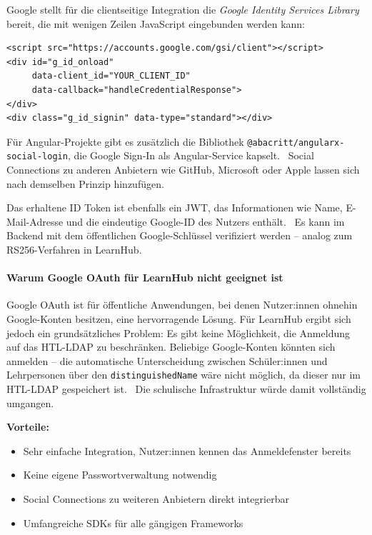 Google stellt für die clientseitige Integration die
\textit{Google Identity Services Library} bereit, die mit wenigen
Zeilen JavaScript eingebunden werden kann:~\cite{google-oauth}

\begin{lstlisting}[style=htmlstyle,
                   caption={Einbindung von Google Sign-In im Frontend},
                   label={lst:google-signin}]
<script src="https://accounts.google.com/gsi/client"></script>
<div id="g_id_onload"
     data-client_id="YOUR_CLIENT_ID"
     data-callback="handleCredentialResponse">
</div>
<div class="g_id_signin" data-type="standard"></div>
\end{lstlisting}

Für Angular-Projekte gibt es zusätzlich die Bibliothek
\texttt{@abacritt/angularx-social-login}, die Google Sign-In als
Angular-Service kapselt.~\cite{google-oauth} Social Connections zu
anderen Anbietern wie GitHub, Microsoft oder Apple lassen sich nach
demselben Prinzip hinzufügen.

Das erhaltene ID Token ist ebenfalls ein JWT, das Informationen wie
Name, E-Mail-Adresse und die eindeutige Google-ID des Nutzers
enthält.~\cite{google-oauth} Es kann im Backend mit dem öffentlichen
Google-Schlüssel verifiziert werden -- analog zum RS256-Verfahren in
LearnHub.

\paragraph{Warum Google OAuth für LearnHub nicht geeignet ist}

Google OAuth ist für öffentliche Anwendungen, bei denen Nutzer:innen
ohnehin Google-Konten besitzen, eine hervorragende Lösung. Für LearnHub
ergibt sich jedoch ein grundsätzliches Problem: Es gibt keine
Möglichkeit, die Anmeldung auf das HTL-LDAP zu beschränken. Beliebige
Google-Konten könnten sich anmelden -- die automatische Unterscheidung
zwischen Schüler:innen und Lehrpersonen über den
\texttt{distinguishedName} wäre nicht möglich, da dieser nur im
HTL-LDAP gespeichert ist.~\cite{google-oauth} Die schulische
Infrastruktur würde damit vollständig umgangen.

\textbf{Vorteile:}
\begin{itemize}
    \item Sehr einfache Integration, Nutzer:innen kennen das
    Anmeldefenster bereits
    \item Keine eigene Passwortverwaltung notwendig
    \item Social Connections zu weiteren Anbietern direkt integrierbar
    \item Umfangreiche SDKs für alle gängigen Frameworks
\end{itemize}

